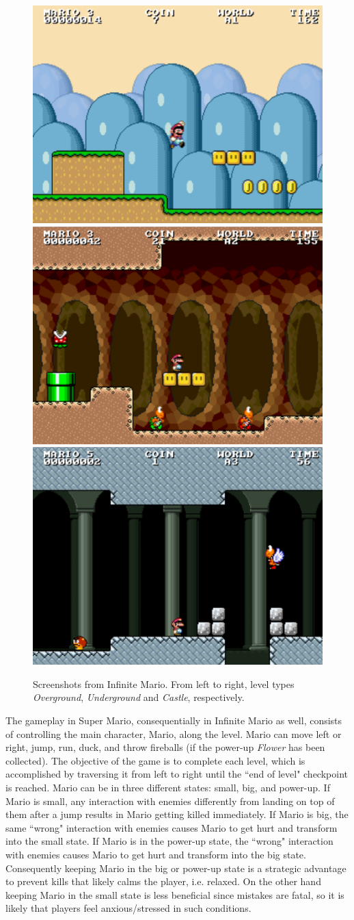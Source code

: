 \begin{figure}[h]
  \centering
  \includegraphics[width=.32\textwidth]{figures/mario-overground}\hfill
  \includegraphics[width=.32\textwidth]{figures/mario-underground}\hfill
  \includegraphics[width=.32\textwidth]{figures/mario-castle}
  \caption{Screenshots from Infinite Mario. From left to right, level types \textit{Overground}, \textit{Underground} and \textit{Castle}, respectively.}
  \label{fig:experiment2-infinite-mario}
\end{figure}

The gameplay in Super Mario, consequentially in Infinite Mario as well, consists of controlling the main character, Mario, along the level. Mario can move left or right, jump, run, duck, and throw fireballs (if the power-up \textit{Flower} has been collected). The objective of the game is to complete each level, which is accomplished by traversing it from left to right until the ``end of level" checkpoint is reached. Mario can be in three different states: small, big, and power-up. If Mario is small, any interaction with enemies differently from landing on top of them after a jump results in Mario getting killed immediately. If Mario is big, the same ``wrong" interaction with enemies causes Mario to get hurt and transform into the small state. If Mario is in the power-up state, the ``wrong" interaction with enemies causes Mario to get hurt and transform into the big state. Consequently keeping Mario in the big or power-up state is a strategic advantage to prevent kills that likely calms the player, i.e. relaxed. On the other hand keeping Mario in the small state is less beneficial since mistakes are fatal, so it is likely that players feel anxious/stressed in such conditions.

